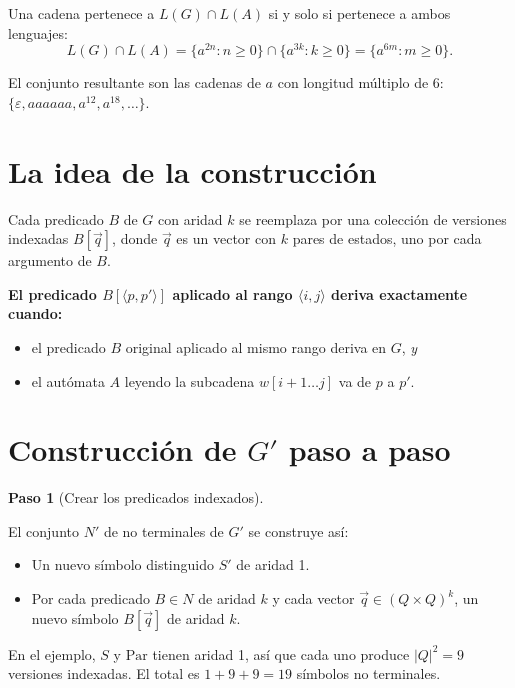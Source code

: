 \documentclass[11pt, letterpaper]{article}
\theoremstyle{definition}
\newtheorem{paso}{Paso}
\newcommand{\eps}{\varepsilon}
\newcommand{\pair}[2]{\langle #1, #2 \rangle}
\newcommand{\Par}{\mathrm{Par}}
\begin{document}
Una cadena pertenece a $L(G) \cap L(A)$ si y solo si pertenece a ambos lenguajes:
\[
L(G) \cap L(A) = \{ a^{2n} : n \geq 0 \} \cap \{ a^{3k} : k \geq 0 \} = \{ a^{6m} : m \geq 0 \}.
\]

El conjunto resultante son las cadenas de $a$ con longitud múltiplo de 6: $\{\eps, aaaaaa, a^{12}, a^{18}, \ldots\}$.

\section{La idea de la construcción}

\begin{tcolorbox}
Cada predicado $B$ de $G$ con aridad $k$ se reemplaza por una colección de versiones indexadas $B[\vec{q}]$, donde $\vec{q}$ es un vector con $k$ pares de estados, uno por cada argumento de $B$.

\smallskip
\textbf{El predicado $B[\pair{p}{p'}]$ aplicado al rango $\pair{i}{j}$ deriva exactamente cuando:}
\begin{itemize}
\item el predicado $B$ original aplicado al mismo rango deriva en $G$, \emph{y}
\item el autómata $A$ leyendo la subcadena $w[i+1 \ldots j]$ va de $p$ a $p'$.
\end{itemize}
\end{tcolorbox}

\section{Construcción de $G'$ paso a paso}

\begin{paso}[Crear los predicados indexados]
\end{paso}

El conjunto $N'$ de no terminales de $G'$ se construye así:

\begin{itemize}
\item Un nuevo símbolo distinguido $S'$ de aridad 1.
\item Por cada predicado $B \in N$ de aridad $k$ y cada vector $\vec{q} \in (Q \times Q)^k$, un nuevo símbolo $B[\vec{q}]$ de aridad $k$.
\end{itemize}

En el ejemplo, $S$ y $\Par$ tienen aridad 1, así que cada uno produce $|Q|^{2} = 9$ versiones indexadas. El total es $1 + 9 + 9 = 19$ símbolos no terminales.
\end{document}
